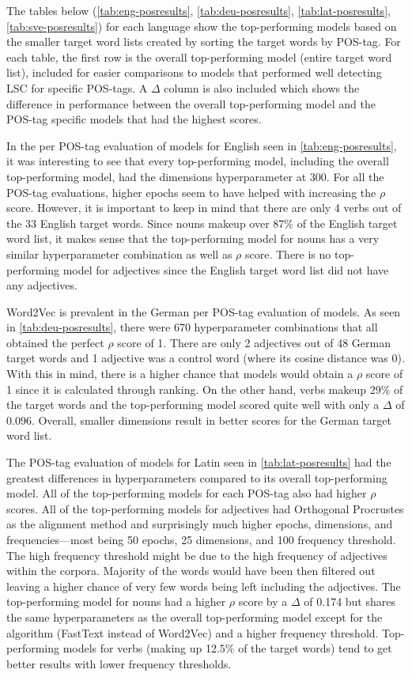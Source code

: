 The tables below (\autoref{tab:eng-posresults}, \autoref{tab:deu-posresults}, \autoref{tab:lat-posresults}, \autoref{tab:sve-posresults}) for each language show the top-performing models based on the smaller target word lists created by sorting the target words by POS-tag. For each table, the first row is the overall top-performing model (entire target word list), included for easier comparisons to models that performed well detecting LSC for specific POS-tags. A $\Delta$ column is also included which shows the difference in performance between the overall top-performing model and the POS-tag specific models that had the highest scores. 

In the per POS-tag evaluation of models for English seen in \autoref{tab:eng-posresults}, it was interesting to see that every top-performing model, including the overall top-performing model, had the dimensions hyperparameter at 300. For all the POS-tag evaluations, higher epochs seem to have helped with increasing the $\rho$ score. However, it is important to keep in mind that there are only 4 verbs out of the 33 English target words. Since nouns makeup over 87\% of the English target word list, it makes sense that the top-performing model for nouns has a very similar hyperparameter combination as well as $\rho$ score. There is no top-performing model for adjectives since the English target word list did not have any adjectives. 


Word2Vec is prevalent in the German per POS-tag evaluation of models. As seen in \autoref{tab:deu-posresults}, there were 670 hyperparameter combinations that all obtained the perfect $\rho$ score of 1. There are only 2 adjectives out of 48 German target words and 1 adjective was a control word (where its cosine distance was 0). With this in mind, there is a higher chance that models would obtain a $\rho$ score of 1 since it is calculated through ranking. On the other hand, verbs makeup 29\% of the target words and the top-performing model scored quite well with only a $\Delta$ of 0.096. Overall, smaller dimensions result in better scores for the German target word list. 


The POS-tag evaluation of models for Latin seen in \autoref{tab:lat-posresults} had the greatest differences in hyperparameters compared to its overall top-performing model. All of the top-performing models for each POS-tag also had higher $\rho$ scores. All of the top-performing models for adjectives had Orthogonal Procrustes as the alignment method and surprisingly much higher epochs, dimensions, and frequencies—most being 50 epochs, 25 dimensions, and 100 frequency threshold. The high frequency threshold might be due to the high frequency of adjectives within the corpora. Majority of the words would have been then filtered out leaving a higher chance of very few words being left including the adjectives. The top-performing model for nouns had a higher $\rho$ score by a $\Delta$ of 0.174 but shares the same hyperparameters as the overall top-performing model except for the algorithm (FastText instead of Word2Vec) and a higher frequency threshold. Top-performing models for verbs (making up 12.5\% of the target words) tend to get better results with lower frequency thresholds.


